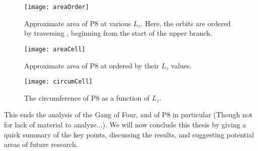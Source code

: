 \begin{figure}[h!]
\texttt{[image: areaOrder]}
\caption{Approximate area of P8 at various $L_z$. Here, the orbits are ordered by traversing , beginning from the start of the upper branch.}\label{fig:areaOrder}
\end{figure}

\begin{figure}[h!]
\texttt{[image: areaCell]}
\caption{Approximate area of P8 at ordered by their $L_z$ values.}\label{fig:areaCell}
\end{figure}

\begin{figure}[h!]
\texttt{[image: circumCell]}
\caption{The circumference of P8 as a function of $L_z$.}\label{fig:circumCell}
\end{figure}

\clearpage 
This ends the analysis of the Gang of Four, and of P8 in particular (Though not for lack of material to analyze...). We will now conclude this thesis by giving a quick summary of the key points, discussing the results, and suggesting potential areas of future research. 